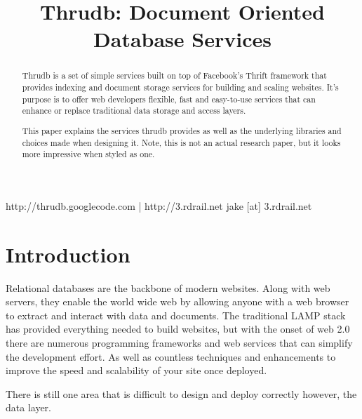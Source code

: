 \documentclass[nocopyrightspace,blockstyle]{sigplanconf}
\begin{document}


\title{Thrudb: Document Oriented Database Services}
\subtitle{}

	   {http://thrudb.googlecode.com | http://3.rdrail.net}
           {jake [at] 3.rdrail.net}
\maketitle

\begin{abstract}
Thrudb is a set of simple services built on top of Facebook’s Thrift framework that provides 
indexing and document storage services for building and scaling websites. 
It’s purpose is to offer web developers flexible, fast and easy-to-use services that can 
enhance or replace traditional data storage and access layers.
   
This paper explains the services thrudb provides as well as the underlying libraries and choices 
made when designing it.  Note, this is not an actual research paper, but it looks more impressive 
when styled as one.
\end{abstract}




\section{Introduction}
Relational databases are the backbone of modern websites.  Along with web servers, they enable the 
world wide web by allowing anyone with a web browser to extract and interact with data and documents.  
The traditional LAMP stack has provided everything needed to build websites, but with the onset of web 2.0
there are numerous programming frameworks and web services that can simplify the development effort. 
As well as countless techniques and enhancements to improve the speed and scalability of your site once deployed.

There is still one area that is difficult to design and deploy correctly however, the data layer.
 
\end{document}
